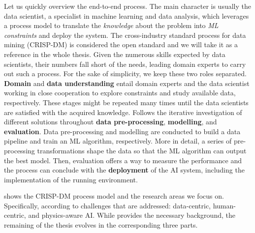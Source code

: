 Let us quickly overview the end-to-end process.
The main character is usually the data scientist, a specialist in machine learning and data analysis, which leverages a process model to translate the \textit{knowledge} about the problem into \textit{ML constraints} and deploy the system.
The cross-industry standard process for data mining \cite{wirth2000crisp} (CRISP-DM) is considered the open standard and we will take it as a reference in the whole thesis.
Given the numerous skills expected by data scientists,
their numbers fall short of the needs,
leading domain experts to carry out such a process.
For the sake of simplicity, we keep these two roles separated.
\textbf{Domain} and \textbf{data understanding} entail domain experts and the data scientist working in close cooperation to explore constraints and study available data, respectively.
These stages might be repeated many times until the data scientists are satisfied with the acquired knowledge.
Follows the iterative investigation of different solutions throughout \textbf{data pre-processing}, \textbf{modelling}, and \textbf{evaluation}.
Data pre-processing and modelling are conducted to build a data pipeline and train an ML algorithm, respectively.
More in detail, a series of pre-processing transformations shape the data so that the ML algorithm can output the best model.
Then, evaluation offers a way to measure the performance and the process can conclude with the \textbf{deployment} of the AI system, including the implementation of the running environment.

 shows the CRISP-DM process model and the research areas we focus on.
Specifically, according to challenges that are addressed: data-centric, human-centric, and physics-aware AI.
While  provides the necessary background, the remaining of the thesis evolves in the corresponding three parts.


